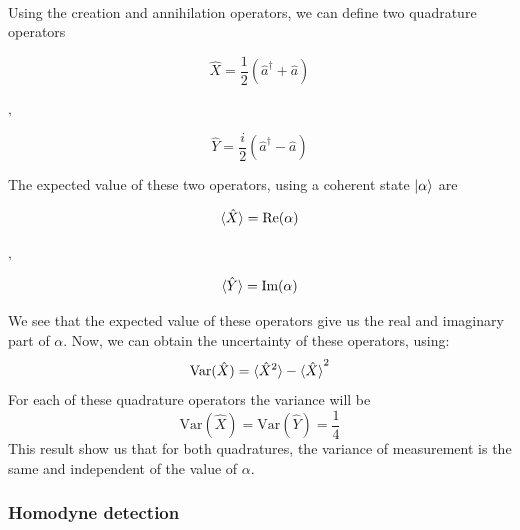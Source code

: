 \begin{bibunit}[plain]
\\
%
%
Using the creation and annihilation operators, we can define two quadrature operators
\cite{loudon2000}
%
\begin{center}
	\begin{minipage}{41mm}
		\noindent
		\begin{equation}
			\hat{X} = \frac{1}{2} \left( \hat{a}^\dagger + \hat{a} \right)
		\end{equation}
	\end{minipage}
	$,\quad$
	\begin{minipage}{40mm}
		\noindent
		\begin{equation}
			\hat{Y} = \frac{i}{2} \left( \hat{a}^\dagger - \hat{a} \right)
		\end{equation}
	\end{minipage}
\end{center}
%
The expected value of these two operators, using a coherent state $\ket{\alpha}$ are
%
\begin{center}
	\begin{minipage}{37mm}
		\noindent
		\begin{equation}
			\braket{\hat{X}} = \textrm{Re}(\alpha)
		\end{equation}
	\end{minipage}
	$,\quad$
	\begin{minipage}{37mm}
		\noindent
		\begin{equation}
			\braket{\hat{Y}} = \textrm{Im}(\alpha)
		\end{equation}
	\end{minipage}
\end{center}
%
We see that the expected value of these operators give us the real and imaginary part of $\alpha$. Now, we can obtain the uncertainty of these operators, using:
%
\begin{equation}
\textrm{Var}(\hat{X}) = \braket{\hat{X}^2} - \braket{\hat{X}}^2
\end{equation}
%
For each of these quadrature operators the variance will be
%
\begin{equation}
\textrm{Var}(\hat{X}) = \textrm{Var}(\hat{Y}) = \frac{1}{4}
\end{equation}
%
This result show us that for both quadratures, the variance of measurement is the same and independent of the value of $\alpha$.
%
%
%
\subsubsection{Homodyne detection}


\end{bibunit}
